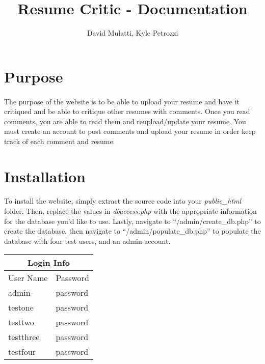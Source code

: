 \documentclass[11pt,letterpaper,titlepage]{article}
\title{Resume Critic - Documentation}
\author{David Mulatti, Kyle Petrozzi}
\date{}
\begin{document}
    \maketitle


    \section{Purpose}
        \paragraph{}
        The purpose of the website is to be able to upload your
        resume and have it critiqued and be able to critique other resumes with
        comments. Once you read comments, you are able to read them and
        reupload/update your resume. You must create an account to post comments
        and upload your resume in order keep track of each comment and resume.

    \section{Installation}
        \paragraph{}
        To install the website, simply extract the source code into your
        \emph{public\_html} folder. Then, replace the values in
        \emph{dbaccess.php} with the appropriate information for the database
        you'd like to use. Lastly, navigate to ``/admin/create\_db.php'' to
        create the database, then navigate to ``/admin/populate\_db.php'' to
        populate the database with four test users, and an admin account.

        \begin{center}
            \begin{tabular}{ | l | l | }
                \multicolumn{2}{c}{Login Info} \\
                \hline
                User Name & Password \\ \hline
                admin & password \\ \hline
                testone & password \\ \hline
                testtwo & password \\ \hline
                testthree & password \\ \hline
                testfour & password \\
                \hline
            \end{tabular}
        \end{center}
\end{document}
